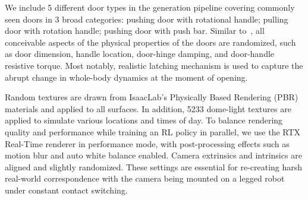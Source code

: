  We include 5 different door types in the generation pipeline covering commonly seen doors in 3 broad categories: pushing door with rotational handle; pulling door with rotation handle; pushing door with push bar. Similar to~\citet{traverse-doors-2025}, all conceivable aspects of the physical properties of the doors are randomized, such as door dimension, handle location, door-hinge damping, and door-handle resistive torque. Most notably, realistic latching mechanism is used to capture the abrupt change in whole-body dynamics at the moment of opening.

 Random textures are drawn from IsaacLab's Physically Based Rendering (PBR) materials and applied to all surfaces. In addition, 5233 dome-light textures are applied to simulate various locations and times of day. To balance rendering quality and performance while training an RL policy in parallel, we use the RTX Real-Time renderer in performance mode, with post-processing effects such as motion blur and auto white balance enabled. Camera extrinsics and intrinsics are aligned and slightly randomized. These settings are essential for re-creating harsh real-world correspondence with the camera being mounted on a legged robot under constant contact switching.
